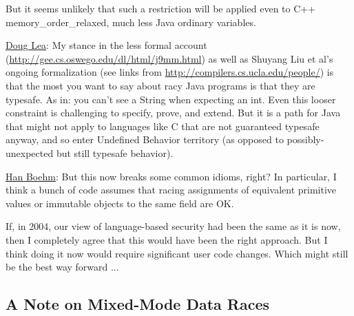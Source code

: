 But it seems unlikely that such a restriction will be applied even to
C++ memory\_order\_relaxed, much less Java ordinary variables.

\bigskip

\href{https://mail.openjdk.java.net/pipermail/jmm-dev/2021-August/000449.html}{Doug
  Lea}:
My stance in the less formal account 
(\url{http://gee.cs.oswego.edu/dl/html/j9mm.html}) as well as Shuyang Liu et 
al's ongoing formalization (see links from 
\url{http://compilers.cs.ucla.edu/people/}) is that the most you want to say 
about racy Java programs is that they are typesafe. As in: you can't see 
a String when expecting an int. Even this looser constraint is 
challenging to specify, prove, and extend. But it is a path for Java 
that might not apply to languages like C that are not guaranteed 
typesafe anyway, and so enter Undefined Behavior territory (as opposed 
to possibly-unexpected but still typesafe behavior).

\smallskip

\href{https://mail.openjdk.java.net/pipermail/jmm-dev/2021-August/000451.html}{Han Boehm}:
But this now breaks some common idioms, right? In particular, I think a
bunch of
code assumes that racing assignments of equivalent primitive values or
immutable
objects to the same field are OK.

If, in 2004, our view of language-based security had been the same as it is
now,
then I completely agree that this would have been the right approach. But I
think
doing it now would require significant user code changes. Which might still
be the best way forward ...



\subsection{A Note on Mixed-Mode Data Races}

